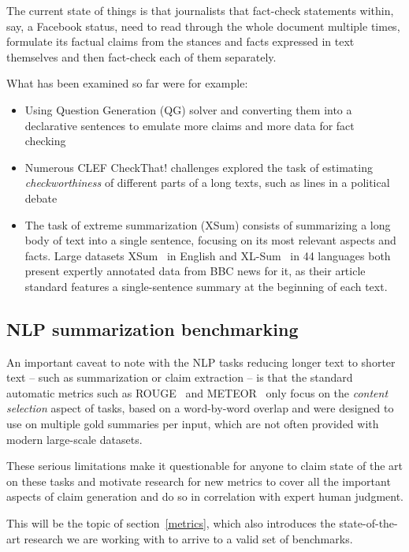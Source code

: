 The current state of things is that journalists that fact-check statements within, say, a Facebook status, need to read through the whole document multiple times, formulate its factual claims from the stances and facts expressed in text themselves and then fact-check each of them separately.

What has been examined so far were for example:
\begin{itemize}
    \item Using Question Generation (QG) solver and converting them into a declarative sentences to emulate more claims and more data for fact checking~\cite{pan2021zeroshot}
    \item Numerous CLEF CheckThat! challenges explored the task of estimating \textit{checkworthiness} of different parts of a long texts, such as lines in a political debate~\cite{clef19,clef21}
    \item The task of extreme summarization (XSum) consists of summarizing a long body of text into a single sentence, focusing on its most relevant aspects and facts. Large datasets XSum~\cite{narayan-etal-2018-dont} in English and XL-Sum~\cite{xlsum} in 44 languages both present expertly annotated data from BBC news for it, as their article standard features a single-sentence summary at the beginning of each text.
\end{itemize}

\subsection{NLP summarization benchmarking}
\label{benchmarking-sota}
An important caveat to note with the NLP tasks reducing longer text to shorter text -- such as summarization or claim extraction -- is that the standard automatic metrics such as ROUGE~\cite{lin-2004-rouge} and METEOR~\cite{banerjee-lavie-2005-meteor} only focus on the \textit{content selection} aspect of tasks, based on a word-by-word overlap and were designed to use on multiple gold summaries per input, which are not often provided with modern large-scale datasets.~\cite{nlpprogress,bert-score,zha2023alignscore}

These serious limitations make it questionable for anyone to claim state of the art on these tasks and motivate research for new metrics to cover all the important aspects of claim generation and do so in correlation with expert human judgment. 

This will be the topic of section~\ref{metrics}, which also introduces the state-of-the-art research we are working with to arrive to a valid set of benchmarks.